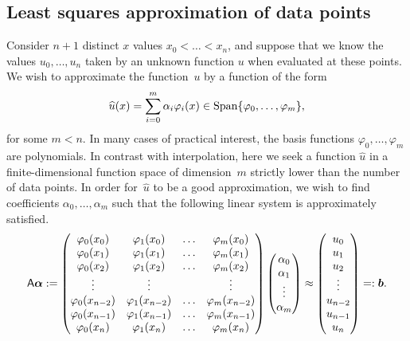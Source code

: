 \subsection{Least squares approximation of data points}
\label{sub:polynomial_regression}
Consider $n + 1$ distinct $x$ values $x_0 < \dotsc < x_n$,
and suppose that we know the values $u_0, \dotsc, u_n$ taken by an unknown function $u$ when evaluated at these points.
We wish to approximate the function~$u$ by a function of the form
\begin{equation}
    \label{eq:expansion_approx}
    \widehat u(x) = \sum_{i=0}^{m} \alpha_i \varphi_i(x) \in \operatorname{Span} \{ \varphi_0, \dotsc, \varphi_m \},
\end{equation}
for some $m < n$.
In many cases of practical interest,
the basis functions $\varphi_0, \dotsc, \varphi_m$ are polynomials.
In contrast with interpolation,
here we seek a function $\widehat u$ in a finite-dimensional function space of dimension~$m$ strictly lower than the number of data points.
In order for~$\widehat u$ to be a good approximation,
we wish to find coefficients $\alpha_0, \dotsc, \alpha_m$ such that
the following linear system is approximately satisfied.
\[
    \mathsf A \mathbf{\boldsymbol{\alpha}} :=
    \begin{pmatrix}
        \varphi_0(x_0) & \varphi_1(x_0) & \hdots & \varphi_m(x_0) \\
        \varphi_0(x_1) & \varphi_1(x_1) & \hdots & \varphi_m(x_1) \\
        \varphi_0(x_2) & \varphi_1(x_2) & \hdots & \varphi_m(x_2) \\
        \vdots & \vdots & & \vdots \\
        \varphi_0(x_{n-2}) & \varphi_1(x_{n-2}) & \hdots & \varphi_m(x_{n-2}) \\
        \varphi_0(x_{n-1}) & \varphi_1(x_{n-1}) & \hdots & \varphi_m(x_{n-1}) \\
        \varphi_0(x_n) & \varphi_1(x_n) & \hdots & \varphi_m(x_n)
    \end{pmatrix}
    \begin{pmatrix}
        \alpha_0 \\
        \alpha_1 \\
        \vdots \\
        \alpha_m
    \end{pmatrix}
    \approx
    \begin{pmatrix}
        u_0 \\
        u_1 \\
        u_2 \\
        \vdots \\
        u_{n-2} \\
        u_{n-1} \\
        u_n
    \end{pmatrix} =: \mathbf{\boldsymbol{b}}.
\]
